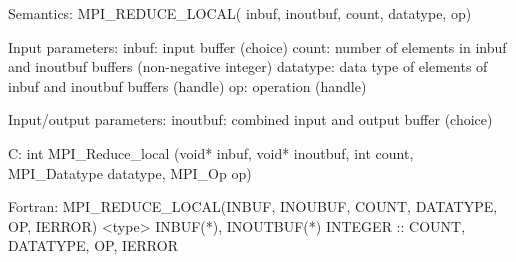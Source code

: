 Semantics:
MPI_REDUCE_LOCAL( inbuf, inoutbuf, count, datatype, op)

Input parameters:
inbuf: input buffer (choice)
count: number of elements in inbuf and inoutbuf buffers
    (non-negative integer)
datatype: data type of elements of inbuf and inoutbuf buffers
    (handle)
op: operation (handle)

Input/output parameters:
inoutbuf: combined input and output buffer (choice)

C:
int MPI_Reduce_local
   (void* inbuf, void* inoutbuf, int count,
    MPI_Datatype datatype, MPI_Op op)

Fortran:
MPI_REDUCE_LOCAL(INBUF, INOUBUF, COUNT, DATATYPE, OP, IERROR)
<type> INBUF(*), INOUTBUF(*)
INTEGER :: COUNT, DATATYPE, OP, IERROR 

